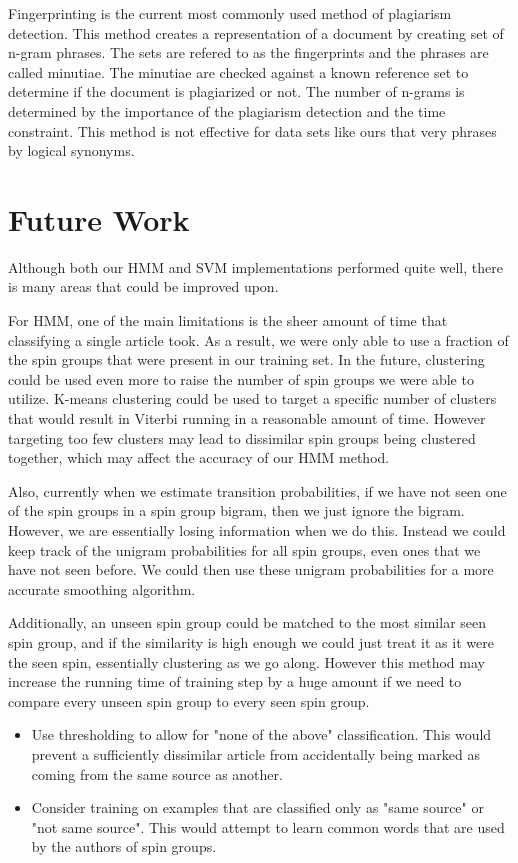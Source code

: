 \documentclass[11pt,letterpaper,oneside, titlepage]{scrartcl}
\begin{document}
Fingerprinting is the current most commonly used method of plagiarism detection. This method creates a representation of a document by creating set of n-gram phrases. The sets are refered to as the fingerprints and the phrases are called minutiae. The minutiae are checked against a known reference set to determine if the document is plagiarized or not. The number of n-grams is determined by the importance of the plagiarism detection and the time constraint. This method is not effective for data sets like ours that very phrases by logical synonyms.

\section{Future Work}
Although both our HMM and SVM implementations performed quite well, there is many areas that could be improved upon.

For HMM, one of the main limitations is the sheer amount of time that classifying a single article took. As a result, we were only able to use a fraction of the spin groups that were present in our training set. In the future, clustering could be used even more to raise the number of spin groups we were able to utilize. K-means clustering could be used to target a specific number of clusters that would result in Viterbi running in a reasonable amount of time. However targeting too few clusters may lead to dissimilar spin groups being clustered together, which may affect the accuracy of our HMM method.

Also, currently when we estimate transition probabilities, if we have not seen one of the spin groups in a spin group bigram, then we just ignore the bigram. However, we are essentially losing information when we do this. Instead we could keep track of the unigram probabilities for all spin groups, even ones that we have not seen before. We could then use these unigram probabilities for a more accurate smoothing algorithm. 

Additionally, an unseen spin group could be matched to the most similar seen spin group, and if the similarity is high enough we could just treat it as it were the seen spin, essentially clustering as we go along. However this method may increase the running time of training step by a huge amount if we need to compare every unseen spin group to every seen spin group.
 
\begin{itemize}

\item Use thresholding to allow for "none of the above" classification.  This would prevent a sufficiently dissimilar article from accidentally being marked as coming from the same source as another.

\item Consider training on examples that are classified only as "same source" or "not same source".  This would attempt to learn common words that are used by the authors of spin groups.

\end{itemize}
\end{document}
